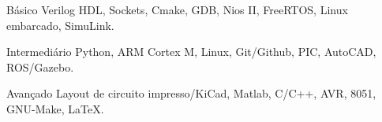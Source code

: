 

\begin{cvskills}

  \cvskill
    {Básico} %
    {Verilog HDL, Sockets, Cmake, GDB, Nios II, FreeRTOS, Linux embarcado, SimuLink.} %

  \cvskill
    {Intermediário} %
    {Python, ARM Cortex M, Linux, Git/Github, PIC, AutoCAD, ROS/Gazebo.} %

  \cvskill
    {Avançado} %
    {Layout de circuito impresso/KiCad, Matlab, C/C++, AVR, 8051, GNU-Make, LaTeX.} %

\end{cvskills}




